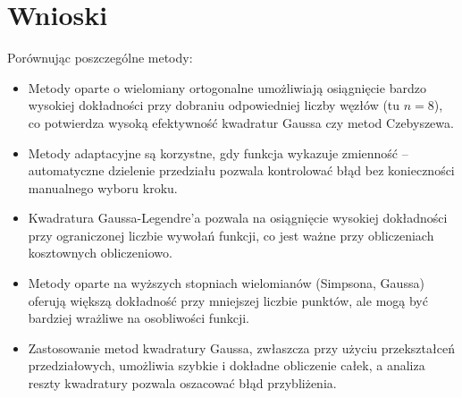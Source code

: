 \documentclass[a4paper,12pt]{article}
\begin{document}
\section{Wnioski}
Porównując poszczególne metody:
\begin{itemize}
    \item Metody oparte o wielomiany ortogonalne umożliwiają osiągnięcie bardzo wysokiej dokładności przy dobraniu odpowiedniej liczby węzłów (tu \(n=8\)), co potwierdza wysoką efektywność kwadratur Gaussa czy metod Czebyszewa.
    \item Metody adaptacyjne są korzystne, gdy funkcja wykazuje zmienność – automatyczne dzielenie przedziału pozwala kontrolować błąd bez konieczności manualnego wyboru kroku.
    \item Kwadratura Gaussa-Legendre'a pozwala na osiągnięcie wysokiej dokładności przy ograniczonej liczbie wywołań funkcji, co jest ważne przy obliczeniach kosztownych obliczeniowo.
    \item Metody oparte na wyższych stopniach wielomianów (Simpsona, Gaussa) oferują większą dokładność przy mniejszej liczbie punktów, ale mogą być bardziej wrażliwe na osobliwości funkcji.     
    \item Zastosowanie metod kwadratury Gaussa, zwłaszcza przy użyciu przekształceń przedziałowych, umożliwia szybkie i dokładne obliczenie całek, a analiza reszty kwadratury pozwala oszacować błąd przybliżenia.
\end{itemize}

\bigskip



\end{document}
